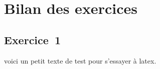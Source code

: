 \chapter{Bilan des exercices}
\section{Exercice~1}

voici un petit texte de test pour s'essayer à latex.

